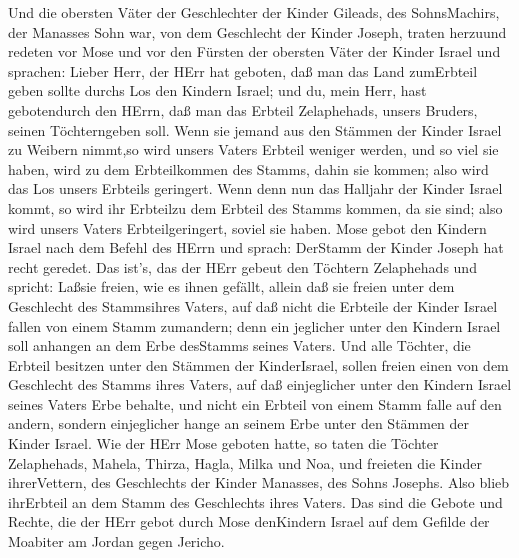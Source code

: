  Und die obersten Väter der Geschlechter der Kinder Gileads,
des SohnsMachirs, der Manasses Sohn war, von dem Geschlecht der Kinder
Joseph, traten herzuund redeten vor Mose und vor den Fürsten der
obersten Väter der Kinder Israel  und sprachen: Lieber Herr,
der HErr hat geboten, daß man das Land zumErbteil geben sollte durchs
Los den Kindern Israel; und du, mein Herr, hast gebotendurch den HErrn,
daß man das Erbteil Zelaphehads, unsers Bruders, seinen Töchterngeben
soll.  Wenn sie jemand aus den Stämmen der Kinder Israel zu
Weibern nimmt,so wird unsers Vaters Erbteil weniger werden, und so viel
sie haben, wird zu dem Erbteilkommen des Stamms, dahin sie kommen; also
wird das Los unsers Erbteils geringert.  Wenn denn nun das
Halljahr der Kinder Israel kommt, so wird ihr Erbteilzu dem Erbteil des
Stamms kommen, da sie sind; also wird unsers Vaters Erbteilgeringert,
soviel sie haben.  Mose gebot den Kindern Israel nach dem
Befehl des HErrn und sprach: DerStamm der Kinder Joseph hat recht
geredet.  Das ist's, das der HErr gebeut den Töchtern
Zelaphehads und spricht: Laßsie freien, wie es ihnen gefällt, allein daß
sie freien unter dem Geschlecht des Stammsihres Vaters,  auf
daß nicht die Erbteile der Kinder Israel fallen von einem Stamm
zumandern; denn ein jeglicher unter den Kindern Israel soll anhangen an
dem Erbe desStamms seines Vaters.  Und alle Töchter, die
Erbteil besitzen unter den Stämmen der KinderIsrael, sollen freien einen
von dem Geschlecht des Stamms ihres Vaters, auf daß einjeglicher unter
den Kindern Israel seines Vaters Erbe behalte,  und nicht
ein Erbteil von einem Stamm falle auf den andern, sondern einjeglicher
hange an seinem Erbe unter den Stämmen der Kinder Israel. 
Wie der HErr Mose geboten hatte, so taten die Töchter Zelaphehads,
 Mahela, Thirza, Hagla, Milka und Noa, und freieten die
Kinder ihrerVettern,  des Geschlechts der Kinder Manasses,
des Sohns Josephs. Also blieb ihrErbteil an dem Stamm des Geschlechts
ihres Vaters.  Das sind die Gebote und Rechte, die der HErr
gebot durch Mose denKindern Israel auf dem Gefilde der Moabiter am
Jordan gegen Jericho.
